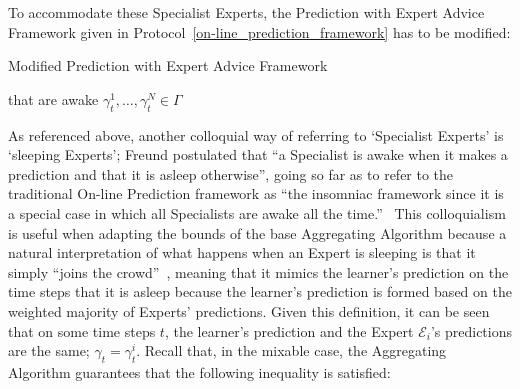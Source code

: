 To accommodate these Specialist Experts, the Prediction with Expert Advice Framework given in Protocol~\ref{on-line_prediction_framework} has to be modified:
\begin{protocol}[H]
    \caption{Modified Prediction with Expert Advice Framework}\label{protocol:modified_prediction_with_expert_advice}
    \begin{algorithmic}[1]
         that are awake
        $\gamma^1_t, \ldots, \gamma^N_t \in \Gamma$
    \end{algorithmic}
\end{protocol}

As referenced above, another colloquial way of referring to `Specialist Experts' is `sleeping Experts'; Freund postulated that ``a Specialist is awake when it makes a prediction and that it is asleep otherwise'', going so far as to refer to the traditional On-line Prediction framework as ``the insomniac framework since it is a special case in which all Specialists are awake all the time.''~\cite{freund:1997} This colloquialism is useful when adapting the bounds of the base Aggregating Algorithm because a natural interpretation of what happens when an Expert is sleeping is that it simply ``joins the crowd''~\cite{kalnishkan:2022}, meaning that it mimics the learner's prediction on the time steps that it is asleep because the learner's prediction is formed based on the weighted majority of Experts' predictions. Given this definition, it can be seen that on some time steps $t$, the learner's prediction and the Expert $\mathcal{E}_i$'s predictions are the same; $\gamma_t = \gamma_t^i$.
Recall that, in the mixable case, the Aggregating Algorithm guarantees that the following inequality is satisfied:

